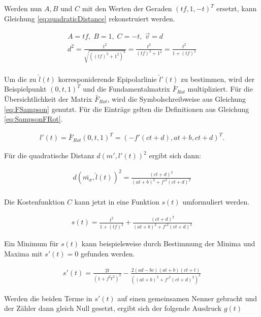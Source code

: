 Werden nun $A,B$ und $C$ mit den Werten der Geraden $(tf,1,-t)^T$ ersetzt, kann Gleichung \ref{eq:quadraticDistance} rekonstruiert werden.

\begin{gather}
	A = tf, \; B= 1, \; C = -t, \; \vec{v} = d\\
	d^2 = \frac{t^2}{\sqrt{((tf)^2+1^2)^2}} = \frac{t^2}{(tf)^2+ 1^2} =  \frac{t^2}{1 + (tf)^2}
\end{gather}\\

Um die zu $\hat{l}(t)$ korresponiderende Epipolarlinie $\hat{l}'(t)$ zu bestimmen, wird der Beispielpunkt $(0,t,1)^T$ und die Fundamentalmatrix $\bar{F}_{Rot}$ multipliziert. Für die Übersichtlichkeit der Matrix  $\bar{F}_{Rot}$, wird die Symbolschreibweise aus Gleichung \ref{eq:FSampson} genutzt. Für die Einträge gelten die Definitionen aus Gleichung \ref{eq:SampsonFRot}.

\begin{gather}
	l'(t) = \bar{F}_{Rot}(0,t,1)^T = (-f'(ct+d),at+b,ct+d)^T.
\end{gather}

Für die quadratische Distanz $d(m',l'(t))^2$ ergibt sich dann:

\begin{gather}
	d(\bar{m_\sigma},\hat{l}(t))^2 = \frac{(ct + d)^2}{(at+b)^2+f'^2(ct+d)^2}
\end{gather} \\

Die Kostenfunktion $C$ kann jetzt in eine Funktion $s(t)$ umformuliert werden.

\begin{gather}
	s(t) = \frac{t^2}{1+(tf)^2} + \frac{(ct + d)^2}{(at+b)^2+f'^2(ct+d)^2}
\end{gather}

Ein Minimum für $s(t)$ kann beispielsweise durch Bestimmung der Minima und Maxima mit $s'(t) = 0$ gefunden werden. 

\begin{gather}
	s'(t) = \frac{2t}{(1+f^2t^2)^2} - \frac{2(ad-bc)(at+b)(ct+t)}{((at+b)^2+f'^2(ct+d)^2)^2}
\end{gather}

Werden die beiden Terme in $s'(t)$ auf einen gemeinsamen Nenner gebracht und der Zähler dann gleich Null gesetzt, ergibt sich der folgende Ausdruck $g(t)$\cite{HZ}

